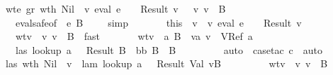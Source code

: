 \begin{isabellebody}
\ \ \ \ \ \ \isamarkupfalse \ wte{}\ gr\ wt{\isacharunderscore}h\ Nil\ \isamarkupfalse \ {\isachardoublequoteopen}{\isacharparenleft}{\isasymexists}v{}{\isachardot}\ eval\ e{}\ {\isasymrho}\ {\isasymmu}\ {\isacharequal}\ Result\ v{}\ {\isasymand}\ {\isasymSigma}\ {\isasymturnstile}v\ v{}\ {\isacharcolon}\ B{\isacharparenright}{\isachardoublequoteclose}\isanewline
\ \ \ \ \ \ \ \ \isamarkupfalse \ eval{\isacharunderscore}safe{\isacharbrackleft}of\ {\isasymGamma}\ e{}\ {\isachardoublequoteopen}B{\isachardoublequoteclose}\ {\isasymSigma}\ {\isasymrho}\ {\isasymmu}{\isacharbrackright}\ \isamarkupfalse \ simp\isanewline
\ \ \ \ \ \ \isamarkupfalse \ this\ \isamarkupfalse \ v{}\ \ v{}{\isacharcolon}\ {\isachardoublequoteopen}eval\ e{}\ {\isasymrho}\ {\isasymmu}\ {\isacharequal}\ Result\ v{}{\isachardoublequoteclose}\isanewline
\ \ \ \ \ \ \ \ \ wtv{}{\isacharcolon}\ {\isachardoublequoteopen}{\isasymSigma}\ {\isasymturnstile}v\ v{}\ {\isacharcolon}\ B{\isachardoublequoteclose}\ \isamarkupfalse \ fast\isanewline
\ \ \ \ \ \ \isamarkupfalse \ wtv{}\ \isamarkupfalse \ a\ B{\isacharprime}\ \ v{}a{\isacharcolon}\ {\isachardoublequoteopen}v{}\ {\isacharequal}\ VRef\ a{\isachardoublequoteclose}\isanewline
\ \ \ \ \ \ \ \ \ las{\isacharcolon}\ {\isachardoublequoteopen}lookup\ a\ {\isasymSigma}\ {\isacharequal}\ Result\ B{\isacharprime}{\isachardoublequoteclose}\ \ bb{\isacharcolon}\ {\isachardoublequoteopen}B{\isacharprime}\ {\isasymsqsubseteq}\ B{\isachardoublequoteclose}\isanewline
\ \ \ \ \ \ \ \ \isamarkupfalse \ auto\ \isamarkupfalse \ {\isacharparenleft}case{\isacharunderscore}tac\ c{\isacharparenright}\ \isamarkupfalse \ auto\ \isamarkupfalse \isanewline
\ \ \ \ \ \ \isamarkupfalse \ las\ wt{\isacharunderscore}h\ Nil\ \isamarkupfalse \ v\ \ lam{\isacharcolon}\ {\isachardoublequoteopen}lookup\ a\ {\isasymmu}\ {\isacharequal}\ Result\ {\isacharparenleft}Val\ v{\isacharcomma}B{\isacharprime}{\isacharparenright}{\isachardoublequoteclose}\isanewline
\ \ \ \ \ \ \ \ \ wtv{\isacharcolon}\ {\isachardoublequoteopen}{\isasymSigma}\ {\isasymturnstile}v\ v\ {\isacharcolon}\ B{\isacharprime}{\isachardoublequoteclose}\isanewline

\end{isabellebody}
